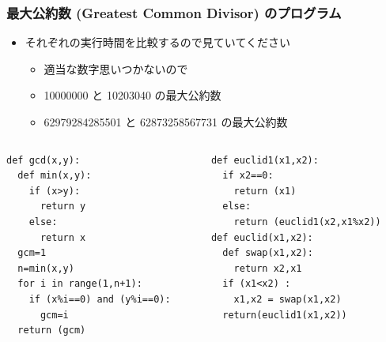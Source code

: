 \begin{frame}
\frametitle{最大公約数 (Greatest Common Divisor) のプログラム}
  \begin{itemize}
\item それぞれの実行時間を比較するので見ていてください
    \begin{itemize}
\item 適当な数字思いつかないので
\item 10000000 と 10203040 の最大公約数
\item 62979284285501 と 62873258567731 の最大公約数
    \end{itemize}
  \end{itemize}
  \begin{columns}[t]
    \begin{column}{0.45\textwidth}
      \begin{lstlisting}[caption={gcd.py}]
def gcd(x,y):
  def min(x,y):
    if (x>y):
      return y
    else:
      return x
  gcm=1
  n=min(x,y)
  for i in range(1,n+1):
    if (x%i==0) and (y%i==0):
      gcm=i
  return (gcm)
      \end{lstlisting}
    \end{column}
    \begin{column}{0.45\textwidth}
      \begin{lstlisting}[caption={gcd.py},label=lst:euclid]
def euclid1(x1,x2):
  if x2==0:
    return (x1)
  else:
    return (euclid1(x2,x1%x2))
def euclid(x1,x2):
  def swap(x1,x2):
    return x2,x1
  if (x1<x2) :
    x1,x2 = swap(x1,x2)
  return(euclid1(x1,x2))
      \end{lstlisting}
    \end{column}
  \end{columns}
\end{frame}
